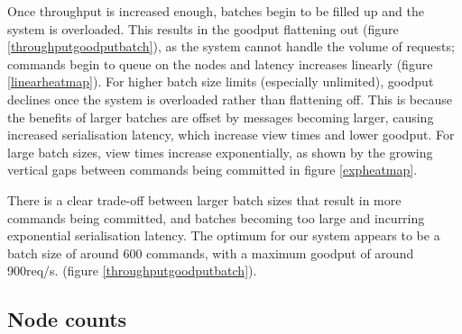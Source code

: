 Once throughput is increased enough, batches begin to be filled up and the system is overloaded. This results in the goodput flattening out (figure \ref{throughputgoodputbatch}), as the system cannot handle the volume of requests; commands begin to queue on the nodes and latency increases linearly (figure \ref{linearheatmap}). For higher batch size limits (especially unlimited), goodput declines once the system is overloaded rather than flattening off. This is because the benefits of larger batches are offset by messages becoming larger, causing increased serialisation latency, which increase view times and lower goodput. For large batch sizes, view times increase exponentially, as shown by the growing vertical gaps between commands being committed in figure \ref{expheatmap}.

There is a clear trade-off between larger batch sizes that result in more commands being committed, and batches becoming too large and incurring exponential serialisation latency. The optimum for our system appears to be a batch size of around 600 commands, with a maximum goodput of around 900req/s. (figure \ref{throughputgoodputbatch}).



\subsection{Node counts} \label{nodecountseval}

